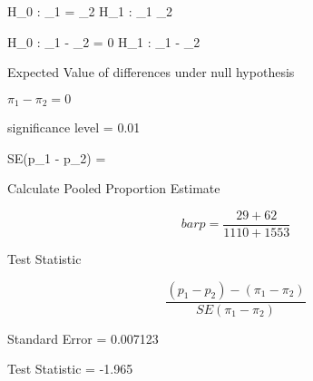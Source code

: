 H_0 : \pi_1 = \pi_2
H_1 : \pi_1 \neq \pi_2

H_0 : \pi_1 - \pi_2 = 0
H_1 : \pi_1 -  \pi_2 

Expected Value of differences under null hypothesis

$\pi_1 - \pi_2 = 0$


significance level = 0.01

SE(p_1 - p_2) = 

Calculate Pooled Proportion Estimate

\[ bar{p} = \frac{29 + 62}{1110 + 1553} \]

Test Statistic

\[ \frac{(p_1 - p_2) - (\pi_1 - \pi_2)}{SE(\pi_1 - \pi_2)} \]


Standard Error = 0.007123

Test Statistic = -1.965
